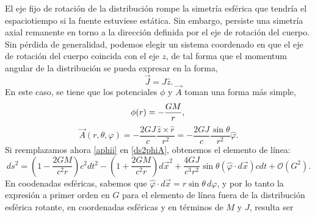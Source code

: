 El eje fijo de rotación de la distribución rompe la simetría esférica que tendría el espaciotiempo si la fuente estuviese estática. Sin embargo, persiste una simetría axial remanente  en torno a la dirección definida por el eje de rotación del cuerpo. Sin pérdida de generalidad, podemos elegir un sistema coordenado en que el eje de rotación del cuerpo coincida con el eje $z$, de tal forma que el momentum angular de la distribución se pueda expresar en la forma,
\begin{equation}
\vec{J}=J\hat{z}.
\end{equation}
En este caso, se tiene que los potenciales $\phi$ y $\vec{A}$ toman una forma más simple,
\begin{equation}
\phi(r) = -\frac{GM}{r},\label{phiii}\\
\end{equation}
\begin{equation}
\vec{A}(r,\theta,\varphi ) = -\frac{2GJ}{c}\frac{\hat{z}\times\hat{r}}{r^2}
=-\frac{2GJ}{c}\frac{\sin \theta }{r^2}\hat{\varphi}%
.\label{aphii}
\end{equation}
Si reemplazamos ahora \eqref{aphii} en \eqref{ds2phiA}, obtenemos el elemento de línea:
\begin{equation}
ds^2=\left(1-\frac{2GM}{c^2r}\right)c^2dt^2-\left(1+\frac{2GM}{c^2r}\right)d\vec{x}^2+\frac{4GJ}{c^3r^2}\sin\theta (\hat\varphi\cdot d\vec{x})cdt+\mathcal{O}(G^2).\label{ds22}
\end{equation}
En coodenadas esféricas, sabemos que $\hat\varphi\cdot d\vec{x}=r\sin\theta\,d\varphi$, y por lo tanto la expresión a primer orden en $G$ para el elemento de línea fuera de la distribución esférica rotante, en coordenadas esféricas y en términos de $M$ y $J$, resulta ser

